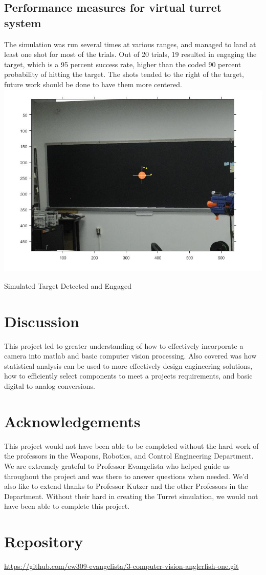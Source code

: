 \documentclass{article}
\begin{document}
\subsection{Performance measures for virtual turret system}
The simulation was run several times at various ranges, and managed to land at least one shot for most of the trials. Out of 20 trials, 19 resulted in engaging the target, which is a 95 percent success rate, higher than the coded 90 percent probability of hitting the target. The shots tended to the right of the target, future work should be done to have them more centered.
\includegraphics[height=5cm width=4cm]{comp vis simul.JPG}
 \caption{Simulated Target Detected and Engaged}
\section{Discussion}
This project led to greater understanding of how to effectively incorporate a camera into matlab and basic computer vision processing. Also covered was how statistical analysis can be used to more effectively design engineering solutions, how to efficiently select components to meet a projects requirements, and basic digital to analog conversions.

\section{Acknowledgements}
This project would not have been able to be completed without the hard work of the professors in the Weapons, Robotics, and Control Engineering Department.  We are extremely grateful to Professor Evangelista who helped guide us throughout the project and was there to answer questions when needed. We'd also like to extend thanks to Professor Kutzer and the other Professors in the Department. Without their hard in creating the Turret simulation, we would not have been able to complete this project.



\appendix

\section{Repository}
\url{https://github.com/ew309-evangelista/3-computer-vision-anglerfish-one.git}
\end{document}
